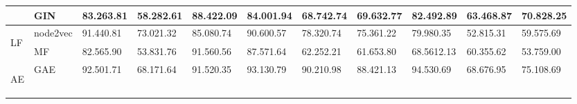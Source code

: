 \documentclass[sigconf, nonacm]{acmart}
\begin{document}
\begin{table*}[t]
{\begin{tabular}{p{12pt}|l|llll|lllll}
             & GIN                    & 83.26{\scriptsize3.81}                                     & 58.28{\scriptsize2.61}                                     & 88.42{\scriptsize2.09}                                     & 84.00{\scriptsize1.94}                                     & 68.74{\scriptsize2.74}                                     & 69.63{\scriptsize2.77}                                     & 82.49{\scriptsize2.89}                                     & 63.46{\scriptsize8.87}                                     & 70.82{\scriptsize8.25}                                      \\ 
\hline
\multirow{2}{*}{{\begin{sideways}LF\end{sideways}}} & node2vec               & 91.44{\scriptsize0.81}                                     & 73.02{\scriptsize1.32}                                     & 85.08{\scriptsize0.74}                                     & 90.60{\scriptsize0.57}                                     & 78.32{\scriptsize0.74}                                     & 75.36{\scriptsize1.22}                                     & 79.98{\scriptsize0.35}                                     & 52.81{\scriptsize5.31}                                     & 59.57{\scriptsize5.69}                                      \\
              & MF                     & 82.56{\scriptsize5.90}                                     & 53.83{\scriptsize1.76}                                     & 91.56{\scriptsize0.56}                                     & 87.57{\scriptsize1.64}                                     & 62.25{\scriptsize2.21}                                     & 61.65{\scriptsize3.80}                                     & 68.56{\scriptsize12.13}                                    & 60.35{\scriptsize5.62}                                     & 53.75{\scriptsize9.00}                                      \\ 
\hline
\multirow{4}{*}{{\begin{sideways}AE\end{sideways}}}  & GAE                    & 92.50{\scriptsize1.71}                                     & 68.17{\scriptsize1.64}                                     & 91.52{\scriptsize0.35}                                     & 93.13{\scriptsize0.79}                                     & 90.21{\scriptsize0.98}                                     & 88.42{\scriptsize1.13}                                     & 94.53{\scriptsize0.69}                                     & 68.67{\scriptsize6.95}                                     & 75.10{\scriptsize8.69}                                      \\

\end{tabular}}
\end{table*}
\end{document}
